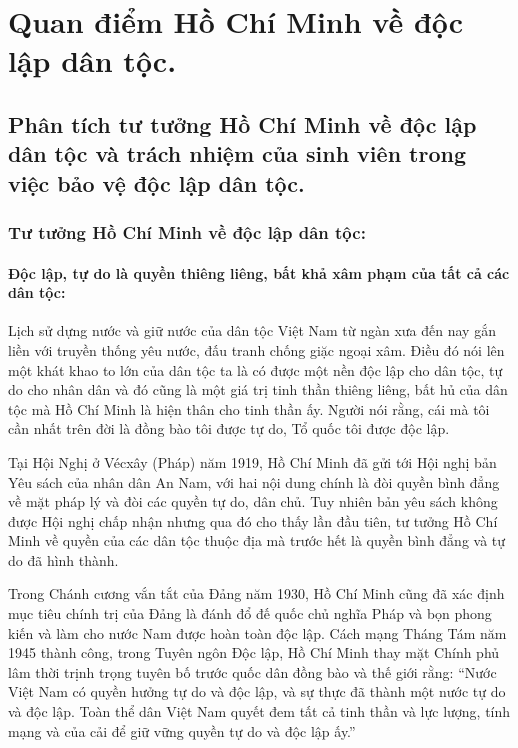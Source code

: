 \section{Quan điểm Hồ Chí Minh về độc lập dân tộc.}

\subsection{Phân tích tư tưởng Hồ Chí Minh về độc lập dân tộc và trách nhiệm của sinh viên trong việc bảo vệ độc lập dân tộc.}

\subsubsection{Tư tưởng Hồ Chí Minh về độc lập dân tộc:}

\paragraph{Độc lập, tự do là quyền thiêng liêng, bất khả xâm phạm của tất cả các dân tộc:}
Lịch sử dựng nước và giữ nước của dân tộc Việt Nam từ ngàn xưa đến nay gắn liền với truyền thống yêu nước, đấu tranh chống giặc ngoại xâm. Điều đó nói lên một khát khao to lớn của dân tộc ta là có được một nền độc lập cho dân tộc, tự do cho nhân dân và đó cũng là một giá trị tinh thần thiêng liêng, bất hủ của dân tộc mà Hồ Chí Minh là hiện thân cho tinh thần ấy. Người nói rằng, cái mà tôi cần nhất trên đời là đồng bào tôi được tự do, Tổ quốc tôi được độc lập.

Tại Hội Nghị ở Vécxây (Pháp) năm 1919, Hồ Chí Minh đã gửi tới Hội nghị bản Yêu sách của nhân dân An Nam, với hai nội dung chính là đòi quyền bình đẳng về mặt pháp lý và đòi các quyền tự do, dân chủ. Tuy nhiên bản yêu sách không được Hội nghị chấp nhận nhưng qua đó cho thấy lần đầu tiên, tư tưởng Hồ Chí Minh về quyền của các dân tộc thuộc địa mà trước hết là quyền bình đẳng và tự do đã hình thành.

Trong Chánh cương vắn tắt của Đảng năm 1930, Hồ Chí Minh cũng đã xác định mục tiêu chính trị của Đảng là đánh đổ đế quốc chủ nghĩa Pháp và bọn phong kiến và làm cho nước Nam được hoàn toàn độc lập. Cách mạng Tháng Tám năm 1945 thành công, trong Tuyên ngôn Độc lập, Hồ Chí Minh thay mặt Chính phủ lâm thời trịnh trọng tuyên bố trước quốc dân đồng bào và thế giới rằng: “Nước Việt Nam có quyền hưởng tự do và độc lập, và sự thực đã thành một nước tự do và độc lập. Toàn thể dân Việt Nam quyết đem tất cả tinh thần và lực lượng, tính mạng và của cải để giữ vững quyền tự do và độc lập ấy.”

